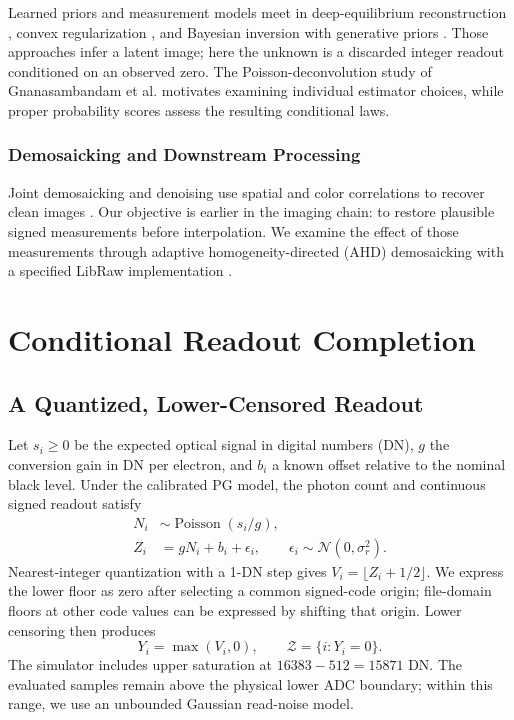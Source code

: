 \documentclass[10pt,twocolumn,journal]{IEEEtran}
\begin{document}
Learned priors and measurement models meet in deep-equilibrium reconstruction \cite{gilton2021}, convex regularization \cite{goujon2023}, and Bayesian inversion with generative priors \cite{bohra2022}. Those approaches infer a latent image; here the unknown is a discarded integer readout conditioned on an observed zero. The Poisson-deconvolution study of Gnanasambandam et al. \cite{gnanasambandam2024} motivates examining individual estimator choices, while proper probability scores \cite{gneiting2007} assess the resulting conditional laws.

\subsubsection{Demosaicking and Downstream Processing}
Joint demosaicking and denoising use spatial and color correlations to recover clean images \cite{gharbi2016}. Our objective is earlier in the imaging chain: to restore plausible signed measurements before interpolation. We examine the effect of those measurements through adaptive homogeneity-directed (AHD) demosaicking \cite{hirakawa2005} with a specified LibRaw implementation \cite{libraw}.

\section{Conditional Readout Completion}
\subsection{A Quantized, Lower-Censored Readout}
Let $s_i\geq0$ be the expected optical signal in digital numbers (DN), $g$ the conversion gain in DN per electron, and $b_i$ a known offset relative to the nominal black level. Under the calibrated PG model, the photon count and continuous signed readout satisfy
\begin{align}
N_i&\sim\operatorname{Poisson}(s_i/g),\label{eq:pois}\\
Z_i&=gN_i+b_i+\epsilon_i,\qquad \epsilon_i\sim\mathcal N(0,\sigma_r^2).\label{eq:forward}
\end{align}
Nearest-integer quantization with a 1-DN step gives $V_i=\lfloor Z_i+1/2\rfloor$. We express the lower floor as zero after selecting a common signed-code origin; file-domain floors at other code values can be expressed by shifting that origin. Lower censoring then produces
\begin{equation}
Y_i=\max(V_i,0),\qquad \mathcal Z=\{i:Y_i=0\}.\label{eq:censor}
\end{equation}
The simulator includes upper saturation at $16383-512=15871$ DN. The evaluated samples remain above the physical lower ADC boundary; within this range, we use an unbounded Gaussian read-noise model.
\end{document}
